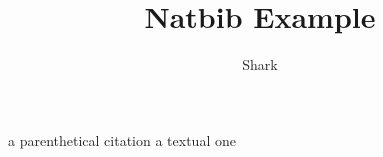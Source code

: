 \documentclass[12pt, twocolumn, a4paper]{article}
\begin{document}

\title{Natbib Example}
\author{Shark}

\maketitle

a parenthetical citation \citep{jon90} %
a textual one \citet{jon90} %


\end{document}
